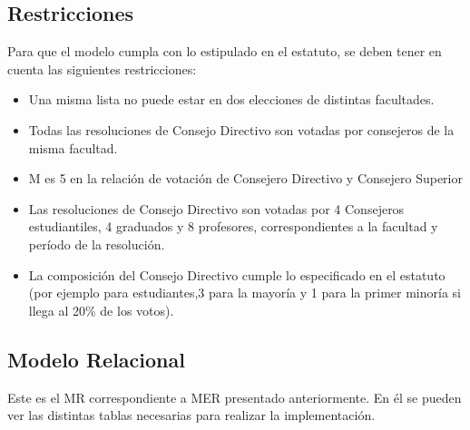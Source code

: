 \subsection{Restricciones}
Para que el modelo cumpla con lo estipulado en el estatuto, se deben tener en cuenta las siguientes restricciones:

\begin{itemize}
\item Una misma lista no puede estar en dos elecciones de distintas facultades.
\item Todas las resoluciones de Consejo Directivo son votadas por consejeros de la misma facultad.
\item M es 5 en la relación de votación de Consejero Directivo y Consejero Superior
\item Las resoluciones de Consejo Directivo son votadas por 4 Consejeros estudiantiles, 4 graduados y 8 profesores, correspondientes a la facultad y período de la resolución.
\item La composición del Consejo Directivo cumple lo especificado en el estatuto (por ejemplo para estudiantes,3 para la mayoría y 1 para la primer minoría si llega al 20\% de los votos).  

\end{itemize}

\subsection{Modelo Relacional}
Este es el MR correspondiente a MER presentado anteriormente. En él se pueden ver las distintas tablas necesarias para realizar la implementación.


